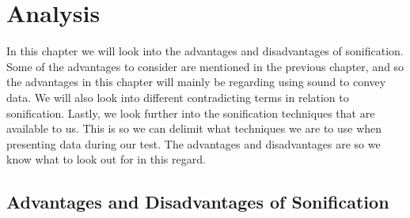 
\section{Analysis} %
\label{sec:analysis}

In this chapter we will look into the advantages and disadvantages of sonification. 
Some of the advantages to consider are mentioned in the previous chapter, and so the advantages in this chapter will mainly be regarding using sound to convey data. 
We will also look into different contradicting terms in relation to sonification. 
Lastly, we look further into the sonification techniques that are available to us. 
This is so we can delimit what techniques we are to use when presenting data during our test. 
The advantages and disadvantages are so we know what to look out for in this regard. 

\FloatBarrier
\subsection{Advantages and Disadvantages of Sonification} %
\label{sub:advantages_and_disadvantages_of_sonification}

